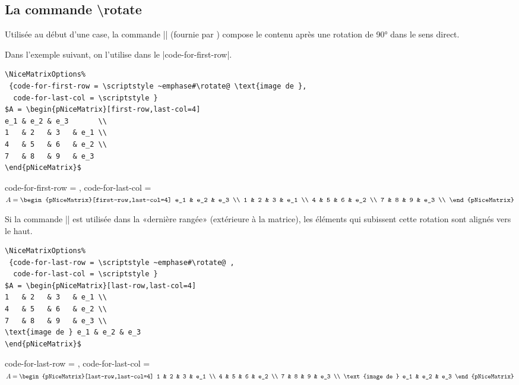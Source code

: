 \documentclass[dvipsnames]{article}%
\begin{document}
\subsection{La commande \textbackslash rotate}

Utilisée au début d'une case, la commande |\rotate| (fournie par ) compose le contenu après une 
rotation de 90° dans le sens direct. 

Dans l'exemple suivant, on l'utilise dans le |code-for-first-row|.

\bigskip

\begin{BVerbatim}[baseline=c,boxwidth=12cm]
\NiceMatrixOptions%
 {code-for-first-row = \scriptstyle ~emphase#\rotate@ \text{image de },
  code-for-last-col = \scriptstyle }
$A = \begin{pNiceMatrix}[first-row,last-col=4]
e_1 & e_2 & e_3       \\
1   & 2   & 3   & e_1 \\
4   & 5   & 6   & e_2 \\
7   & 8   & 9   & e_3 
\end{pNiceMatrix}$
\end{BVerbatim}
\begin{varwidth}{10cm}
\NiceMatrixOptions%
 {code-for-first-row = \scriptstyle\rotate {},
  code-for-last-col = \scriptstyle }
$ A = \begin{pNiceMatrix}[first-row,last-col=4]
e_1 & e_2 & e_3 \\
1   & 2   & 3  & e_1 \\
4   & 5   & 6  & e_2 \\
7   & 8   & 9  & e_3 \\
\end{pNiceMatrix}$
\end{varwidth}

\bigskip
Si la commande |\rotate| est utilisée dans la «dernière rangée» (extérieure à la
matrice), les éléments qui subissent cette rotation sont alignés vers le haut.

\bigskip
\begin{BVerbatim}[baseline=c,boxwidth=12cm]
\NiceMatrixOptions%
 {code-for-last-row = \scriptstyle ~emphase#\rotate@ ,
  code-for-last-col = \scriptstyle }
$A = \begin{pNiceMatrix}[last-row,last-col=4]
1   & 2   & 3   & e_1 \\
4   & 5   & 6   & e_2 \\
7   & 8   & 9   & e_3 \\
\text{image de } e_1 & e_2 & e_3 
\end{pNiceMatrix}$
\end{BVerbatim}
\begin{varwidth}{10cm}
\NiceMatrixOptions%
 {code-for-last-row = \scriptstyle\rotate ,
  code-for-last-col = \scriptstyle }%
$A = \begin{pNiceMatrix}[last-row,last-col=4]
1   & 2   & 3  & e_1 \\
4   & 5   & 6  & e_2 \\
7   & 8   & 9  & e_3 \\
\text{image de } e_1 & e_2 & e_3 
\end{pNiceMatrix}$
\end{varwidth}
\end{document}
